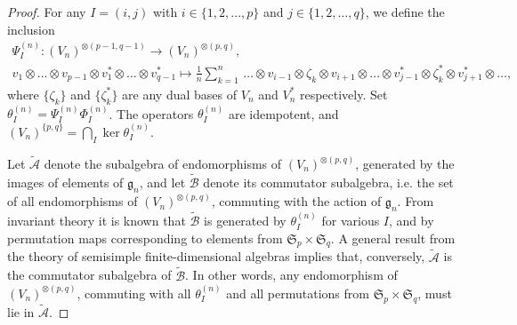 \documentclass[12pt,reqno]{amsart}
\numberwithin{equation}{section}
\theoremstyle{plain}
\theoremstyle{definition}
\def\o{\otimes}
\def\g{\mathfrak g}
\begin{document}
\begin{proof}
For any $I=(i,j)$ with $i\in\{1,2,\dots,p\}$ and
$j\in\{1,2,\dots,q\}$, we define the inclusion
\begin{equation*}
\begin{gathered}
    \Psi_{I}^{(n)}: (V_n)^{\o (p-1,q-1)} \to (V_n)^{\o (p,q)},\\
    v_1 \o\dots\o v_{p-1} \o v^*_1 \o\dots\o v^*_{q-1} \mapsto \frac 1n \sum_{k=1}^n \,  \dots \o
    v_{i-1} \o \zeta_k \o v_{i+1} \o\dots\o v^*_{j-1} \o \zeta_k^* \o v_{j+1}^* \o
    \dots,
\end{gathered}
\end{equation*}
where $\{\zeta_k\}$ and $\{\zeta_k^*\}$ are any dual bases of $V_n$ and $V_n^*$ respectively. Set $\theta_I^{(n)} = \Psi_I^{(n)} \Phi_I^{(n)}$. The operators
$\theta_I^{(n)}$ are idempotent, and $(V_n)^{\{p,q\}} = \bigcap_{I}
\ker \theta_{I}^{(n)}$.


Let $\widetilde{\mathcal A}$ denote the subalgebra of endomorphisms
of $(V_n)^{\o(p,q)}$, generated by the images of elements of $\g_n$,
and let $\widetilde{\mathcal B}$ denote its commutator subalgebra,
i.e. the set of all endomorphisms of $(V_n)^{\o(p,q)}$, commuting
with the action of $\g_n$. From invariant theory it is known that
$\widetilde{\mathcal B}$ is generated by $\theta_I^{(n)}$ for
various $I$, and by permutation maps corresponding to elements from
$\mathfrak S_p \times \mathfrak S_q$. A general result from the
theory of semisimple finite-dimensional algebras implies that,
conversely, $\widetilde{\mathcal A}$ is the commutator subalgebra of
$\widetilde{\mathcal B}$. In other words, any endomorphism of
$(V_n)^{\o(p,q)}$, commuting with all $\theta_I^{(n)}$ and all
permutations from $\mathfrak S_p \times \mathfrak S_q$, must lie in
$\widetilde{\mathcal A}$.


\end{proof}
\end{document}

